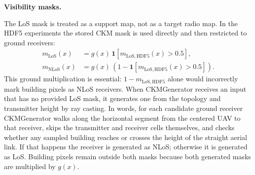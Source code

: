\par\smallskip
\noindent\textbf{Visibility masks.}\par
\noindent
The LoS mask is treated as a support map, not as a target radio map. In the
HDF5 experiments the stored CKM mask is used directly and then restricted to
ground receivers:
\begin{align}
  m_{\mathrm{LoS}}(x)
  &=
  g(x)\,\mathbf{1}\!\left[m_{\mathrm{LoS,HDF5}}(x)>0.5\right],
  \label{eq:los_mask_from_hdf5}\\
  m_{\mathrm{NLoS}}(x)
  &=
  g(x)\,\left(1-\mathbf{1}\!\left[m_{\mathrm{LoS,HDF5}}(x)>0.5\right]\right).
  \label{eq:nlos_mask_from_hdf5}
\end{align}
This ground multiplication is essential: \(1-m_{\mathrm{LoS,HDF5}}\) alone would
incorrectly mark building pixels as NLoS receivers. When CKMGenerator receives
an input that has no provided LoS mask, it generates one from the topology and
transmitter height by ray casting. In words, for each candidate ground receiver
CKMGenerator walks along the horizontal segment from the centered UAV to that
receiver, skips the transmitter and receiver cells themselves, and checks
whether any sampled building reaches or crosses the height of the straight
aerial link. If that happens the receiver is generated as NLoS; otherwise it is
generated as LoS. Building pixels remain outside both masks because both
generated masks are multiplied by \(g(x)\).

